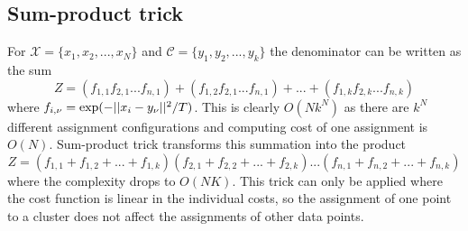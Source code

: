 \documentclass[12pt]{article}
\begin{document}
\subsection{Sum-product trick}
\par For $\mathcal{X} = \{ x_1,x_2,...,x_N \}$ and $\mathcal{C} = \{ y_1,y_2,...,y_k \}$ the denominator can be written as the sum 
\[ Z = (f_{1,1}f_{2,1}...f_{n,1}) + (f_{1,2}f_{2,1}...f_{n,1}) + ... + (f_{1,k}f_{2,k}...f_{n,k}) \]
where $f_{i,\nu} = \exp(-||x_i - y_{\nu}||^2 / T)$. This is clearly $O(N k^N)$ as there are $k^N$ different assignment configurations and computing cost of one assignment is $O(N)$. Sum-product trick transforms this summation into the product
\[ Z = (f_{1,1} + f_{1,2} + ... + f_{1,k}) (f_{2,1} + f_{2,2} + ... + f_{2,k}) ... (f_{n,1} + f_{n,2} + ... + f_{n,k}) \]
where the complexity drops to $O(NK)$. This trick can only be applied where the cost function is linear in the individual costs, so the assignment of one point to a cluster does not affect the assignments of other data points.
\end{document}
